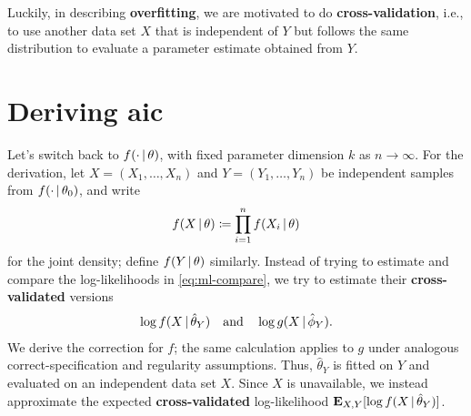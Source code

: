 \documentclass[a4paper,12pt]{article}
\begin{document}
Luckily,
in describing \textbf{overfitting},
we are motivated to do \textbf{cross-validation},
i.e., to use another data set $X$ that is independent of $Y$ but follows the same distribution
to evaluate a parameter estimate obtained from $Y$.

\section{Deriving \texorpdfstring{\acrshort{aic}}{AIC}}

Let's switch back to $f(\cdot\,|\,\theta)$, with fixed parameter dimension $k$ as $n\to\infty$.
For the derivation, let $X=(X_1,\ldots,X_n)$ and $Y=(Y_1,\ldots,Y_n)$ be independent
samples from $f(\cdot\,|\,\theta_0)$, and write
\begin{align*}
	f(X\,|\,\theta)\coloneqq\prod_{i=1}^n f(X_i\,|\,\theta)
\end{align*}
for the joint density; define $f(Y\,|\,\theta)$ similarly.
Instead of trying to estimate and compare the log-likelihoods in \eqref{eq:ml-compare},
we try to estimate their \textbf{cross-validated} versions
\begin{align*}
	\log f(X\,|\,\hat\theta_{Y})
	\quad\text{and}\quad
	\log g(X\,|\,\hat\phi_{Y}).
\end{align*}
We derive the correction for $f$; the same calculation applies to $g$ under analogous
correct-specification and regularity assumptions.
Thus, $\hat\theta_Y$ is fitted on $Y$ and evaluated on an independent data set $X$.
Since $X$ is unavailable, we instead approximate the expected \textbf{cross-validated}
log-likelihood $\operatorname{\text{\textrm{\upshape\textbf{E}}}}_{X,Y}[\log f(X\,|\,\hat\theta_Y)]$.
\end{document}

